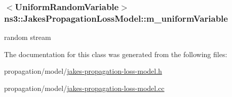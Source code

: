\subsubsection[{\texorpdfstring{m\+\_\+uniform\+Variable}{m_uniformVariable}}]{$<${\bf Uniform\+Random\+Variable}$>$ ns3\+::\+Jakes\+Propagation\+Loss\+Model\+::m\+\_\+uniform\+Variable\hspace{0.3cm}{\ttfamily [private]}}\hypertarget{classns3_1_1JakesPropagationLossModel_a8271aba351f52e1d87c92d8f0f26ddae}{}\label{classns3_1_1JakesPropagationLossModel_a8271aba351f52e1d87c92d8f0f26ddae}


random stream 



The documentation for this class was generated from the following files\+:\begin{DoxyCompactItemize}
\item 
propagation/model/\hyperlink{jakes-propagation-loss-model_8h}{jakes-\/propagation-\/loss-\/model.\+h}\item 
propagation/model/\hyperlink{jakes-propagation-loss-model_8cc}{jakes-\/propagation-\/loss-\/model.\+cc}\end{DoxyCompactItemize}
